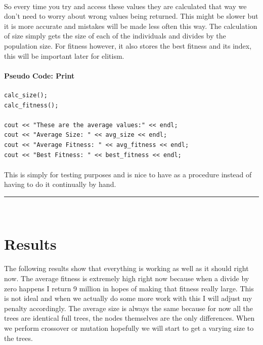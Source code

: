 \documentclass[paper=a4, fontsize=11pt]{scrartcl} %
\numberwithin{equation}{section} %
\numberwithin{figure}{section} %
\numberwithin{table}{section} %
\newcommand{\horrule}[1]{\rule{\linewidth}{#1}} %
\begin{document}
\paragraph{} So every time you try and access these values they are calculated that way we don't need to worry about wrong values being returned. This might be slower but it is more accurate and mistakes will be made less often this way. The calculation of size simply gets the size of each of the individuals and divides by the population size. For fitness however, it also stores the best fitness and its index, this will be important later for elitism.

\paragraph{Pseudo Code: Print}
\begin{verbatim}
calc_size();
calc_fitness();

cout << "These are the average values:" << endl;
cout << "Average Size: " << avg_size << endl;
cout << "Average Fitness: " << avg_fitness << endl;
cout << "Best Fitness: " << best_fitness << endl;
\end{verbatim}

\paragraph{} This is simply for testing purposes and is nice to have as a procedure instead of having to do it continually by hand.


\horrule{0.5pt} \\[0.4cm] %
\section{Results}


\paragraph{} The following results show that everything is working as well as it should right now. The average fitness is extremely high right now because when a divide by zero happens I return 9 million in hopes of making that fitness really large. This is not ideal and when we actually do some more work with this I will adjust my penalty accordingly. The average size is always the same because for now all the trees are identical full trees, the nodes themselves are the only differences. When we perform crossover or mutation hopefully we will start to get a varying size to the trees.
\end{document}
